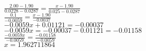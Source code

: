\documentclass{article}
\begin{document}
    \begin{center}
        $\frac{2.00-1.90}{0.0228-0.0287}=\frac{x-1.90}{0.025-0.0287}$\\$\frac{0.1}{-0.0059}=\frac{x-1.90}{-0.0037}$\\
        $-0.0059x+0.01121=-0.00037$\\$-0.0059x=-0.00037-0.01121=-0.01158$\\$\frac{-0.0059x}{-0.0059}=\frac{-0.01158}{-0.0059}$\\
        $x=1.962711864$
    \end{center}
\end{document}
